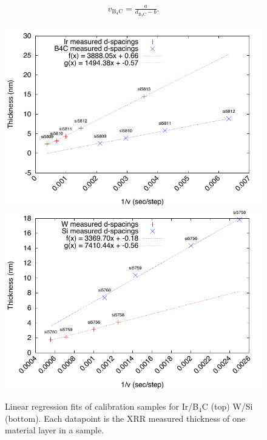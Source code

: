 \begin{eqnarray}
	v_{\mathrm{B}_4\mathrm{C}} = \frac{a}{d_{\mathrm{B}_4\mathrm{C}}-b}.
\end{eqnarray}

\begin{figure}[!h]
	\center
\includegraphics[width=0.8\linewidth]{figures/chamber/calibration_plot-ir-b4c.pdf}
\includegraphics[width=0.8\linewidth]{figures/chamber/calibration_plot-w-si.pdf}
\caption{\footnotesize Linear regression fits of calibration samples for Ir/B$_4$C (top) W/Si (bottom). Each datapoint is the XRR measured thickness of one material layer in a sample.}\label{fig:calib-fit}
\end{figure}
